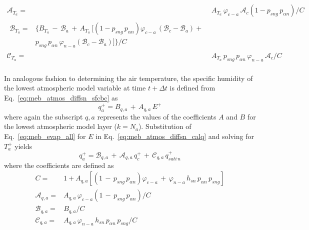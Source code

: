 {\begin{subequations}
\begin{align}
\\
\label{eq:meb_atmos_coupl_coefs_s_a}
{\mathscr A}_{T_a} =& A_{T_a} \,\varphi_{c-a} \, {\mathcal A}_{c} \left(1- p_{sng}\,p_{\alpha n}\right)/C
\\
\label{eq:meb_atmos_coupl_coefs_s_b}
\begin{split}
{\mathscr B}_{T_a} =&\Big\lbrace
B_{T_a} \,-\, {\mathcal B}_{a} \,+\,A_{T_a} \,\Big\lbrack
\left(1-p_{sng}\,p_{\alpha n} \right)\varphi_{c-a} \, \left( {\mathcal B}_{c} - {\mathcal B}_{a}\right) + 
\\
& p_{sng}\,p_{\alpha n}\,\varphi_{n-a}\left( {\mathcal B}_{c} - {\mathcal B}_{a}\right) 
\Big\rbrack
\Big\rbrace/C
\end{split}
\\
\label{eq:meb_atmos_coupl_coefs_s_c}
{\mathscr C}_{T_a} =& A_{T_a} \,p_{sng}\,p_{\alpha n}\,\varphi_{n-a} \, {\mathcal A}_{c} /C
\\
\end{align}
\end{subequations}
%
%


In analogous fashion to determining the air temperature,
the specific humidity of the lowest
atmospheric model variable at time $t+\Delta t$ is
defined from Eq.~\ref{eq:meb_atmos_diffsn_sfcbc} as
%
\begin{equation}
\label{eq:meb_atmos_diffsn_calq}
q_{a}^+ = B_{q,a} \,+\, A_{q,a}\,E^+
\end{equation}
%
where again the subscript $q,a$ represents the values 
of the coefficients $A$ and $B$ for the lowest atmospheric model layer
($k=N_a$).
Substitution of Eq.~\ref{eq:meb_evap_all} for $E$ in 
Eq.~\ref{eq:meb_atmos_diffsn_calq}
and solving for $T_a^+$ yields
%
\begin{equation}
  \label{eq:meb_mass_atmos_a}
q_{a}^+ = {\mathscr B}_{q,a} \,+\, {\mathscr A}_{q,a}\, q_c^+ 
\,+\,  {\mathscr C}_{q,a} \, q_{sati\,n}^+
%
\end{equation}
%
where 
the coefficients are defined as
%
\begin{subequations}\label{eq:meb_atmos_coupl_coefs_q_a}
\begin{align}
C =& 1 +
A_{q,a} \left[ \left(1 \,-\,p_{sng}\,p_{\alpha n} \right) \varphi_{c-a} 
\,+\, \varphi_{n-a} \, h_{sn} \,p_{\alpha n}\,p_{sng} \right]
\\
{\mathscr A}_{q,a} =& A_{q,a} \,\varphi_{c-a} \left(1 \,-\,p_{sng}\,p_{\alpha n} \right) /C
\\
{\mathscr B}_{q,a} =& B_{q,a}/C
\\
{\mathscr C}_{q,a} =& A_{q,a}\,\varphi_{n-a} \, h_{sn} \,p_{\alpha n}\,p_{sng}/C
%
\end{align}
\end{subequations}



}
